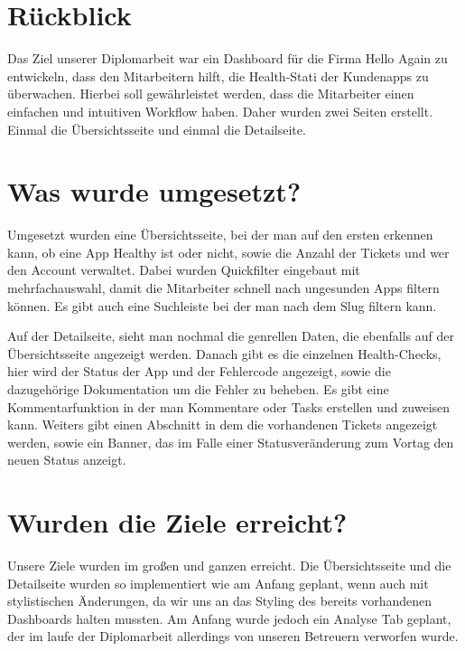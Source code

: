 \section{Rückblick}

Das Ziel unserer Diplomarbeit war ein Dashboard für die Firma Hello Again zu entwickeln, dass den Mitarbeitern hilft, die Health-Stati der Kundenapps zu überwachen.
Hierbei soll gewährleistet werden, dass die Mitarbeiter einen einfachen und intuitiven Workflow haben.
Daher wurden zwei Seiten erstellt.
Einmal die Übersichtsseite und einmal die Detailseite.


\section{Was wurde umgesetzt?}

Umgesetzt wurden eine Übersichtsseite, bei der man auf den ersten erkennen kann, ob eine App Healthy ist oder nicht, sowie die Anzahl der Tickets und wer den Account verwaltet.
Dabei wurden Quickfilter eingebaut mit mehrfachauswahl, damit die Mitarbeiter schnell nach ungesunden Apps filtern können.
Es gibt auch eine Suchleiste bei der man nach dem Slug filtern kann.

Auf der Detailseite, sieht man nochmal die genrellen Daten, die ebenfalls auf der Übersichtsseite angezeigt werden.
Danach gibt es die einzelnen Health-Checks, hier wird der Status der App und der Fehlercode angezeigt, sowie die dazugehörige Dokumentation um die Fehler zu beheben.
Es gibt eine Kommentarfunktion in der man Kommentare oder Tasks erstellen und zuweisen kann.
Weiters gibt einen Abschnitt in dem die vorhandenen Tickets angezeigt werden, sowie ein Banner, das im Falle einer Statusveränderung zum Vortag den neuen Status anzeigt.


\section{Wurden die Ziele erreicht?}

Unsere Ziele wurden im großen und ganzen erreicht.
Die Übersichtsseite und die Detailseite wurden so implementiert wie am Anfang geplant, wenn auch mit stylistischen Änderungen, da wir uns an das Styling des bereits vorhandenen Dashboards halten mussten.
Am Anfang wurde jedoch ein Analyse Tab geplant, der im laufe der Diplomarbeit allerdings von unseren Betreuern verworfen wurde.


